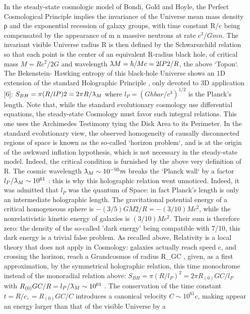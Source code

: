 In the steady-state cosmologic model of Bondi, Gold and Hoyle, the Perfect Cosmological
Principle implies the invariance of the Universe mean mass density ρ and the exponential recession
of galaxy groups, with time constant R/c being compensated by the appearance of m n massive
neutrons at rate $c^{3} /Gm n $. The invariant visible Universe radius R is then defined by the
Schwarszchild relation so that each point is the center of an equivalent R-radius black hole, of
critical mass $M = Rc^{2} /2G$ and wavelength $\lambdabar M = \hbar/Mc = 2l P2 /R$, the above `Topon`. The Bekenstein-
Hawking entropy of this black-hole Universe shows an 1D extension of the standard Holographic
Principle , only devoted to 3D application [6]:
$S_{BH} = \pi(R/l P )2 = 2\pi R/\lambdabar_{M}$
where $l_{P} = (Ghbar/c^3 )^{1/2}$ is the Planck's length. Note that, while the standard evolutionary cosmology
use differential equations, the steady-state Cosmology must favor such integral relations. This one
uses the Archimedes Testimony tying the Disk Area to its Perimeter.
In the standard evolutionary view, the observed homogeneity of causally disconnected regions
of space is known as the so-called `horizon problem`, and is at the origin of the awkward inflation
hypothesis, which is not necessary in the steady-state model. Indeed, the critical condition is
furnished by the above very definition of R.
The cosmic wavelength $\lambdabar_M \sim 10^{-95} m$ breaks the `Planck wall` by a factor $l_{P} /\lambdabar_{M} \sim 10^{61}$ : this is why this holographic relation went unnoticed. Indeed, it was admitted that $l_{P}$ was the quantum of Space: in fact Planck's length is only an intermediate holographic length.
The gravitational potential energy of a critical homogeneous sphere is $-(3/5)GM2/R = -
(3/10)Mc^{2}$, while the nonrelativistic kinetic energy of galaxies is $(3/10)Mc^{2}$. Their sum is therefore
zero: the density of the so-called 'dark energy' being compatible with 7/10, this dark energy is a
trivial false problem. As recalled above, Relativity is a local theory that does not apply in
Cosmology: galaxies actually reach speed c, and crossing the horizon, reach a Grandcosmos of
radius R_{GC} , given, as a first approximation, by the symmetrical holographic relation, this time
monochrome instead of the monoradial relation above:
$S_{BH} = \pi(R/l_P )^{2} = 2\pi R_{(0)} GC /l_{P}$
with $R_{(0)} GC /R = l_{P} /\lambdabar_{M} \sim 10^{61}$ . The conservation of the time constant $t = R/c, = R_{(0)} GC /C$ introduces a canonical velocity $C \sim 10^{61} c$, making appear an energy larger than that of the visible Universe by a
